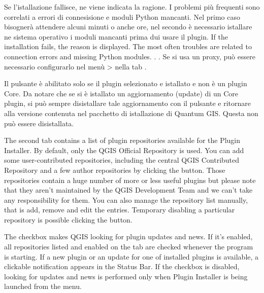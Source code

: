 Se l'istallazione fallisce, ne viene indicata la ragione. I problemi più frequenti sono correlati a errori di connesisione e moduli Python mancanti. Nel primo caso bisognerà attendere alcuni minuti o anche ore, nel secondo è necessario istallare ne sistema operativo i moduli mancanti  prima dui usare il plugin. If the installation fails, the reason is displayed. The most often troubles are related to connection errors and missing Python modules. . . Se si usa un proxy, può essere necessario configurarlo nel menù  >  nella tab .

Il pulsante  è abilitato solo se il plugin selezionato e istallato e non è un plugin Core. Da notare che se si è istallato un aggiornamento (update) di un Core plugin, si può sempre disistallare tale aggiornamento con il pulsante  e ritornare alla versione contenuta nel pacchetto di istallazione di Quantum GIS. Questa non può essere disistallata.


The second tab  contains a list of plugin repositories available for the Plugin Installer. By default, only the QGIS Official Repository is used. You can add some user-contributed repositories, including the central QGIS Contributed Repository and a few author repositories by clicking the  button. Those repositories contain a huge number of more or less useful plugins but please note that they aren't maintained by the QGIS Development Team and we can't take any responsibility for them. You can also manage the repository list manually, that is add, remove and edit the entries. Temporary disabling a particular repository is possible clicking the  button.

The  checkbox makes QGIS looking for plugin updates and news. If it's enabled, all repositories listed and enabled on the  tab are checked whenever the program is starting. If a new plugin or an update for one of installed plugins is available, a clickable notification appears in the Status Bar. If the checkbox is disabled, looking for updates and news is performed only when Plugin Installer is being launched from the menu.

